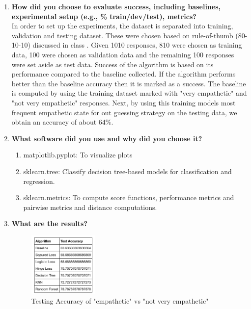 \documentclass[5px]{report}
\begin{document}
\begin{enumerate}
\item \textbf{How did you choose to evaluate success, including baselines, experimental setup (e.g., \% train/dev/test), metrics?}\\
In order to set up the experiments, the dataset is separated into training, validation and testing dataset. These were chosen based on rule-of-thumb (80-10-10) discussed in class . Given 1010 responses, 810 were chosen as training data, 100 were chosen as validation data and the remaining 100 responses were set aside as test data. Success of the algorithm is based on its performance compared to the baseline collected. If the algorithm performs better than the baseline accuracy then it is marked as a success.
The baseline is computed by using the training dataset marked with "very empathetic" and "not very empathetic" responses. Next, by using this training models most frequent empathetic state for out guessing strategy on the testing data, we obtain an accuracy of about 64\%.

\item \textbf{What software did you use and why did you choose it?}
  \begin{enumerate}
     \item matplotlib.pyplot: To visualize plots
     \item sklearn.tree: Classify decision tree-based models for classification and regression.
     \item sklearn.metrics: To compute score functions, performance metrics and pairwise metrics and distance computations.
 \end{enumerate}

\item \textbf{What are the results?}
\begin{figure}[h]
  \centering
  \includegraphics[height=1.25in]{results.png}
  \caption{Testing Accuracy of "empathetic" vs "not very empathetic"}
  \label{f:myplotfig}
\end{figure}


\end{enumerate}
\end{document}
